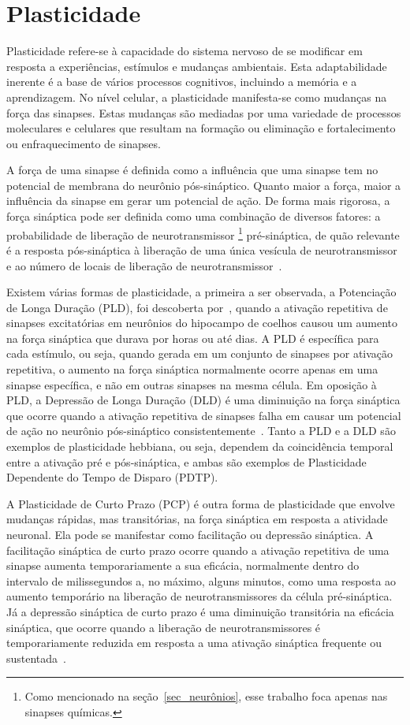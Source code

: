 \section{Plasticidade}\label{section_plasticidade}

Plasticidade refere-se à capacidade do sistema nervoso de se modificar em resposta a experiências, estímulos e mudanças
ambientais. Esta adaptabilidade inerente é a base de vários processos cognitivos, incluindo a memória e a aprendizagem. No nível
celular, a plasticidade manifesta-se como mudanças na força das sinapses. Estas mudanças são mediadas por uma variedade de
processos moleculares e celulares que resultam na formação ou eliminação e fortalecimento ou enfraquecimento de sinapses.

A força de uma sinapse é definida como a influência que uma sinapse tem no potencial de membrana do neurônio pós-sináptico. Quanto
maior a força, maior a influência da sinapse em gerar um potencial de ação. De forma mais rigorosa, a força sináptica pode ser
definida como uma combinação de diversos fatores: a probabilidade de liberação de neurotransmissor
\footnote{Como mencionado na seção~\ref{sec_neurônios}, esse trabalho foca apenas nas sinapses químicas.}
pré-sináptica, de quão relevante é a resposta pós-sináptica à liberação de uma única vesícula de neurotransmissor e ao número de
locais de liberação de neurotransmissor~\cite{fattSpontaneous1952}. 

Existem várias formas de plasticidade, a primeira a ser observada, a Potenciação de Longa Duração (PLD), foi descoberta
por~\cite{blissLonglasting1973}, quando a ativação repetitiva de sinapses excitatórias em neurônios do hipocampo de coelhos causou
um aumento na força sináptica que durava por horas ou até dias. A PLD é específica para cada estímulo, ou seja, quando gerada em
um conjunto de sinapses por ativação repetitiva, o aumento na força sináptica normalmente ocorre apenas em uma sinapse específica,
e não em outras sinapses na mesma célula. Em oposição à PLD, a Depressão de Longa Duração (DLD) é uma diminuição na força
sináptica que ocorre quando a ativação repetitiva de sinapses falha em causar um potencial de ação no neurônio pós-sináptico
consistentemente~\cite{dudekHomosynaptic1992}. Tanto a PLD e a DLD são exemplos de plasticidade hebbiana, ou seja, dependem da
coincidência temporal entre a ativação pré e pós-sináptica, e ambas são exemplos de Plasticidade Dependente do Tempo de Disparo
(PDTP).

A Plasticidade de Curto Prazo (PCP) é outra forma de plasticidade que envolve mudanças rápidas, mas transitórias, na força
sináptica em resposta a atividade neuronal. Ela pode se manifestar como facilitação ou depressão sináptica. A facilitação
sináptica de curto prazo ocorre quando a ativação repetitiva de uma sinapse aumenta temporariamente a sua eficácia, normalmente
dentro do intervalo de milissegundos a, no máximo, alguns minutos, como uma resposta ao aumento temporário na liberação de
neurotransmissores da célula pré-sináptica. Já a depressão sináptica de curto prazo é uma diminuição transitória na eficácia
sináptica, que ocorre quando a liberação de neurotransmissores é temporariamente reduzida em resposta a uma ativação sináptica
frequente ou sustentada~\cite{zuckerShortTerm2002}.

